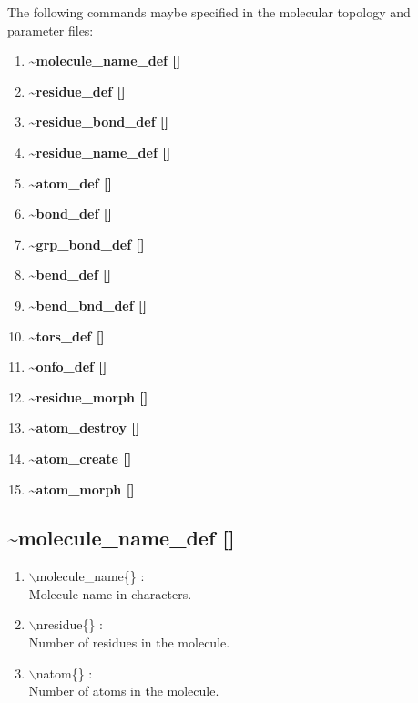\documentclass[12pt,titlepage]{article}
\begin{document}
The following commands maybe specified in the molecular topology 
and parameter files:
\begin{enumerate}
\item {\bf \~{ }molecule\_name\_def []}
\item {\bf \~{ }residue\_def []}
\item {\bf \~{ }residue\_bond\_def []}
\item {\bf \~{ }residue\_name\_def []}
\item {\bf \~{ }atom\_def []} 
\item {\bf \~{ }bond\_def []}
\item {\bf \~{ }grp\_bond\_def []}
\item {\bf \~{ }bend\_def []}
\item {\bf \~{ }bend\_bnd\_def []}
\item {\bf \~{ }tors\_def []}
\item {\bf \~{ }onfo\_def   []}   
\item {\bf \~{ }residue\_morph []}
\item {\bf \~{ }atom\_destroy []}
\item {\bf \~{ }atom\_create []}
\item {\bf \~{ }atom\_morph []}
\end{enumerate}

\newpage
\subsection*{\bf \~{ }molecule\_name\_def []}

\begin{enumerate}

 \vspace{0.15in} 
 \item  $\backslash$molecule\_name\{\} : \\ 
    Molecule name in characters.

 \vspace{0.15in} 
 \item  $\backslash$nresidue\{\} : \\ 
    Number of residues in the molecule.

 \vspace{0.15in} 
 \item  $\backslash$natom\{\} : \\ 
    Number of atoms in the molecule.
\end{enumerate}
\end{document}
